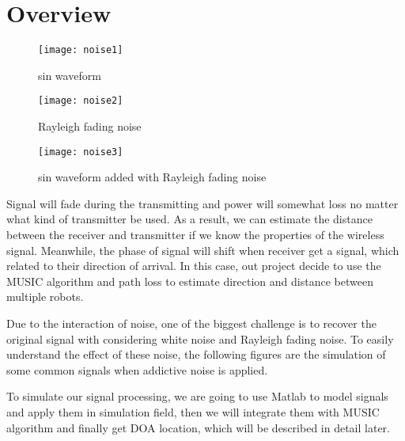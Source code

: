 
\section{Overview}
\label{sec:overview}
	
	\begin{figure}[ht]
	\centering
	\texttt{[image: noise1]}
	\caption{sin waveform}
	\end{figure}
	
	\begin{figure}[ht]
	\centering
	\texttt{[image: noise2]}
	\caption{Rayleigh fading noise}
	\end{figure}

	\begin{figure}[ht]
	\centering
	\texttt{[image: noise3]}
	\caption{sin waveform added with Rayleigh fading noise}
	\end{figure}
	
	Signal will fade during the transmitting and power will somewhat loss no matter what kind of transmitter be used. As a result, we can estimate the distance between the receiver and transmitter if we know the properties of the wireless signal. Meanwhile, the phase of signal will shift when receiver get a signal, which related to their direction of arrival. In this case, out project decide to use the MUSIC algorithm and path loss to estimate direction and distance between multiple robots.
	\par
	Due to the interaction of noise, one of the biggest challenge is to recover the original signal with considering white noise and Rayleigh fading noise. To easily understand the effect of these noise, the following figures are the simulation of some common signals when addictive noise is applied.
	
	\par
	To simulate our signal processing, we are going to use Matlab to model signals and apply them in simulation field, then we will integrate them with MUSIC algorithm and finally get DOA location, which will be described in detail later. 



